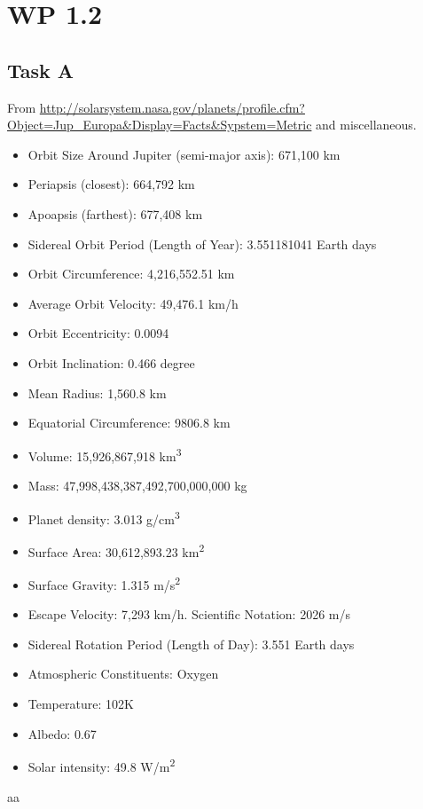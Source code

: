 \documentclass{article}
\begin{document}
\section*{WP 1.2}
\subsection*{Task A}
From \url{http://solarsystem.nasa.gov/planets/profile.cfm?Object=Jup_Europa&Display=Facts&Sypstem=Metric} and miscellaneous.
\begin{itemize}
\item{Orbit Size Around Jupiter (semi-major axis):}  671,100 km
\item{Periapsis (closest):}  664,792 km
\item{Apoapsis (farthest):}  677,408 km
\item{Sidereal Orbit Period (Length of Year):} 3.551181041 Earth days
\item{Orbit Circumference:}  4,216,552.51 km
\item{Average Orbit Velocity:}  49,476.1 km/h
\item{Orbit Eccentricity:} 0.0094
\item{Orbit Inclination:} 0.466 degree
\item{Mean Radius:}  1,560.8 km
\item{Equatorial Circumference:}  9806.8 km
\item{Volume:}  15,926,867,918 \si{km^3}
\item{Mass:}  47,998,438,387,492,700,000,000 kg
\item{Planet density:}  3.013 \si{g/cm^3}
\item{Surface Area:}  30,612,893.23 \si{km^2}
\item{Surface Gravity:}  1.315 \si{m/s^2}
\item{Escape Velocity:}  7,293 km/h. Scientific Notation: 2026 m/s
\item{Sidereal Rotation Period (Length of Day):} 3.551 Earth days
\item{Atmospheric Constituents:} Oxygen
\item{Temperature:} 102K
\item{Albedo:} 0.67
\item{Solar intensity:} 49.8 \si{W/m^2}
\end{itemize}aa
\end{document}
